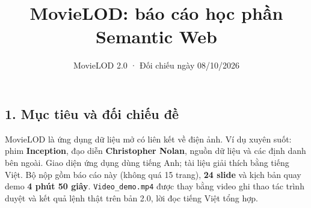 \documentclass[
  11pt,
]{article}
\title{MovieLOD: báo cáo học phần Semantic Web}
\author{}
\date{MovieLOD 2.0 · Đối chiếu ngày 08/10/2026}
\begin{document}
\maketitle

\subsection{1. Mục tiêu và đối chiếu
đề}\label{mux1ee5c-tiuxeau-vuxe0-ux111ux1ed1i-chiux1ebfu-ux111ux1ec1}

MovieLOD là ứng dụng dữ liệu mở có liên kết về điện ảnh. Ví dụ xuyên
suốt: phim \textbf{Inception}, đạo diễn \textbf{Christopher Nolan},
nguồn dữ liệu và các định danh bên ngoài. Giao diện ứng dụng dùng tiếng
Anh; tài liệu giải thích bằng tiếng Việt. Bộ nộp gồm báo cáo này (không
quá 15 trang), \textbf{24 slide} và kịch bản quay demo \textbf{4 phút 50
giây}. \texttt{Video\_\allowbreak{}de\allowbreak{}mo.\allowbreak{}mp4}
được thay bằng video ghi thao tác trình duyệt và kết quả lệnh thật trên
bản 2.0, lời đọc tiếng Việt tổng hợp.
\end{document}
